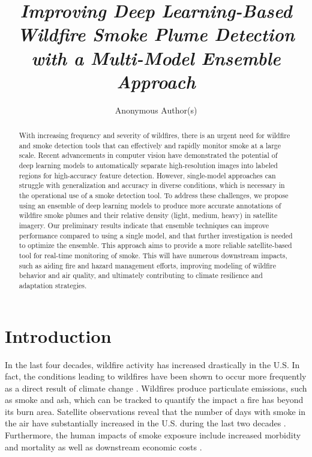 \documentclass{article}
\title{\textit{Improving Deep Learning-Based Wildfire Smoke Plume Detection with a Multi-Model Ensemble Approach}}
\author{%
Anonymous Author(s)
}
\begin{document}
\maketitle

\begin{abstract}
With increasing frequency and severity of wildfires, there is an urgent need for wildfire and smoke detection tools that can effectively and rapidly monitor smoke at a large scale. Recent advancements in computer vision have demonstrated the potential of deep learning models to automatically separate high-resolution images into labeled regions for high-accuracy feature detection. However, single-model approaches can struggle with generalization and accuracy in diverse conditions, which is necessary in the operational use of a smoke detection tool. To address these challenges, we propose using an ensemble of deep learning models to produce more accurate annotations of wildfire smoke plumes and their relative density (light, medium, heavy) in satellite imagery. Our preliminary results indicate that ensemble techniques can improve performance compared to using a single model, and that further investigation is needed to optimize the ensemble. This approach aims to provide a more reliable satellite-based tool for real-time monitoring of smoke. This will have numerous downstream impacts, such as aiding fire and hazard management efforts, improving modeling of wildfire behavior and air quality, and ultimately contributing to climate resilience and adaptation strategies.
\end{abstract}

\section{Introduction}
In the last four decades, wildfire activity has increased drastically in the U.S. In fact, the conditions leading to wildfires have been shown to occur more frequently as a direct result of climate change \citep{wildfire-risk}. Wildfires produce particulate emissions, such as smoke and ash, which can be tracked to quantify the impact a fire has beyond its burn area. Satellite observations reveal that the number of days with smoke in the air have substantially increased in the U.S. during the last two decades \citep{wildfire-risk}. Furthermore, the human impacts of smoke exposure include increased morbidity and mortality as well as downstream economic costs \citep{health-impacts}.
\end{document}

